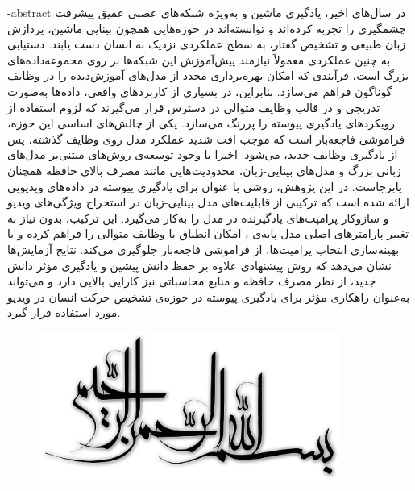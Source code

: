 \surname{}

\fa-abstract{
در سال‌های اخیر، یادگیری ماشین و به‌ویژه شبکه‌های عصبی عمیق پیشرفت چشمگیری را تجربه کرده‌اند و توانسته‌اند در حوزه‌هایی همچون بینایی ماشین، پردازش زبان طبیعی و تشخیص گفتار، به سطح عملکردی نزدیک به انسان دست یابند. دستیابی به چنین عملکردی معمولاً نیازمند پیش‌آموزش این شبکه‌ها بر روی مجموعه‌داده‌های بزرگ است، فرآیندی که امکان بهره‌برداری مجدد از مدل‌های آموزش‌دیده را در وظایف گوناگون فراهم می‌سازد.
بنابراین، در بسیاری از کاربردهای واقعی، داده‌ها به‌صورت تدریجی و در قالب وظایف متوالی در دسترس قرار می‌گیرند که لزوم استفاده از رویکردهای یادگیری پیوسته را پررنگ می‌سازد. یکی از چالش‌های اساسی این حوزه، فراموشی فاجعه‌بار است که موجب افت شدید عملکرد مدل روی وظایف گذشته، پس از یادگیری وظایف جدید، می‌شود. اخیرا با وجود توسعه‌ی روش‌های مبتنی‌بر مدل‌های زبانی بزرگ و مدل‌های بینایی-زبان، محدودیت‌هایی مانند مصرف بالای حافظه همچنان پابرجاست.
در این پژوهش، روشی با عنوان  برای یادگیری پیوسته در داده‌های ویدیویی ارائه شده است که ترکیبی از قابلیت‌های مدل بینایی-زبان  در استخراج ویژگی‌های ویدیو و سازوکار پرامپت‌های یادگیرنده در مدل  را به‌کار می‌گیرد. این ترکیب، بدون نیاز به تغییر پارامترهای اصلی مدل پایه‌ی ، امکان انطباق با وظایف متوالی را فراهم کرده و با بهینه‌سازی انتخاب پرامپت‌ها، از فراموشی فاجعه‌بار جلوگیری می‌کند. نتایج آزمایش‌ها نشان می‌دهد که روش پیشنهادی علاوه بر حفظ دانش پیشین و یادگیری مؤثر دانش جدید، از نظر مصرف حافظه و منابع محاسباتی نیز کارایی بالایی دارد و می‌تواند به‌عنوان راهکاری مؤثر برای یادگیری پیوسته در حوزه‌ی تشخیص حرکت انسان در ویدیو مورد استفاده قرار گیرد.
}





\AUTtitle
\vspace*{7cm}
\thispagestyle{empty}
\begin{center}
\includegraphics[height=5cm,width=12cm]{Images/besm.jpg}
\end{center}